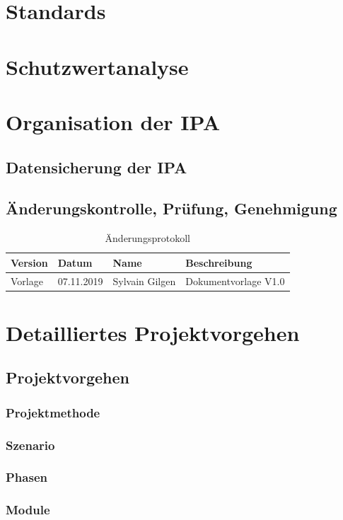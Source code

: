 \documentclass{report}
\begin{document}
\chapter{Standards}

\chapter{Schutzwertanalyse}

\chapter{Organisation der IPA}
\section{Datensicherung der IPA}
\section{Änderungskontrolle, Prüfung, Genehmigung}
\begin{table}[h!]
    \caption{Änderungsprotokoll}
    \begin{tabular}{|L{0.23\textwidth}|L{0.23\textwidth}|L{0.23\textwidth}|L{0.23\textwidth}|}
        \hline
        Version & Datum & Name & Beschreibung \\
        \hline
        Vorlage & 07.11.2019 & Sylvain Gilgen & Dokumentvorlage V1.0\\
        \hline
    \end{tabular}
\end{table}
\chapter{Detailliertes Projektvorgehen}
\section{Projektvorgehen}
\subsection{Projektmethode}
\subsection{Szenario}
\subsection{Phasen}
\subsection{Module}
\end{document}
